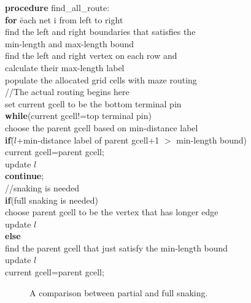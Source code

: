\begin{tabbing}
{\bf pro}\={\bf cedure} find\_all\_route:\\
\> {\bf for} \= each net i from left to right  \\
\> \> find the left and right boundaries that satisfies the\\ 
\> \> min-length and max-length bound\\
\> \> find the left and right vertex on each row and\\
\> \> calculate their max-length label\\
\> \> populate the allocated grid cells with maze routing\\
\> \> //The actual routing begins here\\
\> \> set current gcell to be the bottom terminal pin\\
\> \> {\bf whi}\={\bf le}(current gcell!=top terminal pin)\\     
\> \> \> choose the parent gcell based on min-distance label\\
\> \> \> {\bf if}(\=$l$+min-distance label of parent gcell+1 $>$ min-length bound)\\
\> \> \> \> current gcell=parent gcell;\\
\> \> \> \> update $l$\\
\> \> \> \> {\bf continue};\\

\> \> \> //snaking is needed\\
\> \> \> {\bf if}(fu\=ll snaking is needed)\\
\> \> \> \> choose parent gcell to be the vertex that has longer edge\\
\> \> \> \> update $l$\\
\> \> \> {\bf else} \=\\
\> \> \> \> find the parent gcell that just satisfy the min-length bound\\
\> \> \> \> update $l$\\
\> \> \> current gcell=parent gcell;\\
\end{tabbing}
\begin{figure}[here]
  \begin{center}
  \end{center}
  \caption{A comparison between partial and full snaking.}
  \label{fig:sample_parandfull}
\end{figure}

